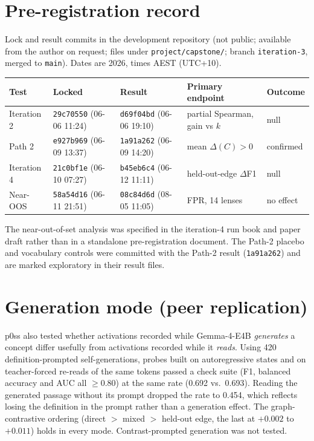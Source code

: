 \documentclass[11pt]{article}
\newcommand{\dF}{$\Delta$F1}
\begin{document}
\section{Pre-registration record}
\label{app:prereg}
Lock and result commits in the development repository (not public; available from the author on
request; files under
\texttt{project/capstone/}; branch \texttt{iteration-3}, merged to \texttt{main}). Dates are 2026, times AEST
(UTC+10).

\begin{table}[h]
  \centering
  \small
  \setlength{\tabcolsep}{4pt}
  \begin{tabular}{lllll}
    \toprule
    Test & Locked & Result & Primary endpoint & Outcome \\
    \midrule
    Iteration 2 & \texttt{29c70550} (06-06 11:24) & \texttt{d69f04bd} (06-06 19:10) & partial Spearman, gain vs $k$ & null \\
    Path 2      & \texttt{e927b969} (06-09 13:37) & \texttt{1a91a262} (06-09 14:20) & mean $\Delta(C)>0$ & confirmed \\
    Iteration 4 & \texttt{21c0bf1e} (06-10 07:27) & \texttt{b45eb6c4} (06-12 11:11) & held-out-edge \dF{} & null \\
    Near-OOS    & \texttt{58a54d16} (06-11 21:51) & \texttt{08c84d6d} (08-05 11:05) & FPR, 14 lenses & no effect \\
    \bottomrule
  \end{tabular}
\end{table}

The near-out-of-set analysis was specified in the iteration-4 run book and paper draft rather than in a
standalone pre-registration document. The Path-2 placebo and vocabulary controls were committed with the Path-2
result (\texttt{1a91a262}) and are marked exploratory in their result files.

\section{Generation mode (peer replication)}
\label{app:generation}
p0ss also tested whether activations recorded while Gemma-4-E4B \emph{generates} a concept differ usefully from
activations recorded while it \emph{reads}. Using 420 definition-prompted self-generations, probes built on
autoregressive states and on teacher-forced re-reads of the same tokens passed a check suite (F1, balanced
accuracy and AUC all $\ge 0.80$) at the same rate (0.692 vs.\ 0.693). Reading the generated passage without its
prompt dropped the rate to 0.454, which reflects losing the definition in the prompt rather than a generation
effect. The graph-contrastive ordering (direct $>$ mixed $>$ held-out edge, the last at $+0.002$ to $+0.011$)
holds in every mode. Contrast-prompted generation was not tested.
\end{document}
